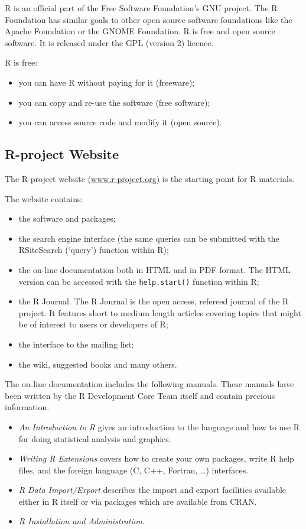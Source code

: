 \documentclass[]{book}
\providecommand{\tightlist}{%
  \setlength{\itemsep}{0pt}\setlength{\parskip}{0pt}}
\def\tightlist{}
\begin{document}
R is an official part of the Free Software Foundation's GNU project. The
R Foundation has similar goals to other open source software foundations
like the Apache Foundation or the GNOME Foundation. R is free and open
source software. It is released under the GPL (version 2) licence.

R is free:

\begin{itemize}
\tightlist
\item
  you can have R without paying for it (freeware);
\item
  you can copy and re-use the software (free software);
\item
  you can access source code and modify it (open source).
\end{itemize}

\subsection{R-project Website}\label{r-project-website}

The R-project website
\href{http://www.r-project.org/}{(www.r-project.org)} is the starting
point for R materials.

The website contains:

\begin{itemize}
\tightlist
\item
  the software and packages;
\item
  the search engine interface (the same queries can be submitted with
  the RSiteSearch (`query') function within R);
\item
  the on-line documentation both in HTML and in PDF format. The HTML
  version can be accessed with the \texttt{help.start()} function within
  R;
\item
  the R Journal. The R Journal is the open access, refereed journal of
  the R project. It features short to medium length articles covering
  topics that might be of interest to users or developers of R;
\item
  the interface to the mailing list;
\item
  the wiki, suggested books and many others.
\end{itemize}

The on-line documentation includes the following manuals. These manuals
have been written by the R Development Core Team itself and contain
precious information.

\begin{itemize}
\tightlist
\item
  \emph{An Introduction to R} gives an introduction to the language and
  how to use R for doing statistical analysis and graphics.
\item
  \emph{Writing R Extensions} covers how to create your own packages,
  write R help files, and the foreign language (C, C++, Fortran,
  \ldots{}) interfaces.
\item
  \emph{R Data Import/Export} describes the import and export facilities
  available either in R itself or via packages which are available from
  CRAN.
\item
  \emph{R Installation and Administration}.
\end{itemize}
\end{document}
